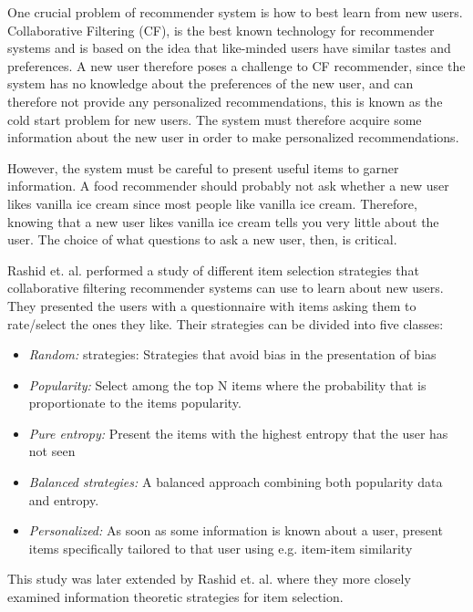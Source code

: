 One crucial problem of recommender system is how to best learn from new users. Collaborative Filtering (CF), is the best known technology for recommender systems and is based on the idea that like-minded users have similar tastes and preferences. A new user therefore poses a challenge to CF recommender, since the system has no knowledge about the preferences of the new user, and can therefore not provide any personalized recommendations, this is known as the cold start problem for new users. The system must therefore acquire some information about the new user in order to make personalized recommendations.

However, the system must be careful to present useful items to garner information. A food recommender should probably not ask whether a new user likes vanilla ice cream since most people like vanilla ice cream. Therefore, knowing that a new user likes vanilla ice cream tells you very little about the user. The choice of what questions to ask a new user, then, is critical.

Rashid et. al. \cite{Rashid2002} performed a study of different item selection strategies that collaborative filtering recommender systems can use to learn about new users. They presented the users with a questionnaire with items asking them to rate/select the ones they like. Their strategies can be divided into five classes:

\begin{itemize}
\item \emph{Random:} strategies: Strategies that avoid bias in the presentation of bias
\item \emph{Popularity:} Select among the top N items where the probability that is proportionate to the items popularity.
\item \emph{Pure entropy:} Present the items with the highest entropy that the user has not seen
\item \emph{Balanced strategies:} A balanced approach combining both popularity data and entropy.
\item \emph{Personalized:} As soon as some information is known about a user, present items specifically tailored to that user using e.g. item-item similarity
\end{itemize}

This study was later extended by Rashid et. al. \cite{Rashid2008} where they more closely examined information theoretic strategies for item selection.


